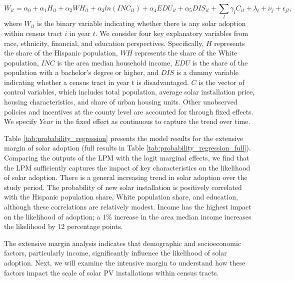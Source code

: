 \documentclass[11pt,twoside,letterpaper]{article}
\begin{document}
\begin{equation}\label{reg_1}
W_{it}= \alpha_{0} + \alpha_{1}H_{it} + \alpha_{2}WH_{it} + \alpha_{3}ln(INC_{it}) + \alpha_{4}EDU_{it} + \alpha_{5}DIS_{it} +\sum_{l}\gamma_{l}C_{it} + \lambda_{t} + \nu_{j} + \epsilon_{jt},
\end{equation}
where $W_{it}$ is the binary variable indicating whether there is any solar adoption within census tract $i$ in year $t$. We consider four key explanatory variables from race, ethnicity, financial, and education perspectives. Specifically, $H$ represents the share of the Hispanic population, $WH$ represents the share of the White population, $INC$ is the area median household income, $EDU$ is the share of the population with a bachelor's degree or higher, and $DIS$ is a dummy variable indicating whether a census tract in year t is disadvantaged. $C$ is the vector of control variables, which includes total population, average solar installation price, housing characteristics, and share of urban housing units. Other unobserved policies and incentives at the county level are accounted for through fixed effects. We specify $Year$ in the fixed effect as continuous to capture the trend over time.


Table \ref{tab:probability_regression} presents the model results for the extensive margin of solar adoption (full results in Table \ref{tab:probability_regression_full}). Comparing the outputs of the LPM with the logit marginal effects, we find that the LPM sufficiently captures the impact of key characteristics on the likelihood of solar adoption. There is a general increasing trend in solar adoption over the study period. The probability of new solar installation is positively correlated with the Hispanic population share, White population share, and education, although these correlations are relatively modest. Income has the highest impact on the likelihood of adoption; a 1\% increase in the area median income increases the likelihood by 12 percentage points. 

The extensive margin analysis indicates that demographic and socioeconomic factors, particularly income, significantly influence the likelihood of solar adoption. Next, we will examine the intensive margin to understand how these factors impact the scale of solar PV installations within census tracts.
\end{document}
